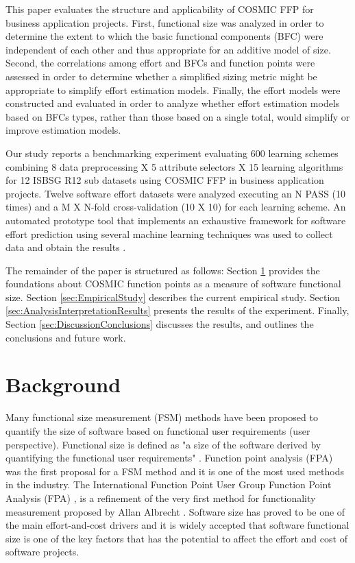 \documentclass[conference]{IEEEtran}
\begin{document}
This paper evaluates the structure and applicability of COSMIC FFP for business application projects. First, functional size was analyzed in order to determine the extent to which the basic functional components (BFC) were independent of each other and thus appropriate for an additive model of size. Second, the correlations among effort and BFCs and function points were assessed in order to determine whether a simplified sizing metric might be appropriate to simplify effort estimation models. Finally, the effort models were constructed and evaluated in order to analyze whether effort estimation models based on BFCs types, rather than those based on a single total, would simplify or improve estimation models.

Our study reports a benchmarking experiment evaluating 600 learning schemes combining 8 data preprocessing X 5 attribute selectors X 15 learning algorithms for 12 ISBSG R12 sub datasets using COSMIC FFP in business application projects. Twelve software effort datasets were analyzed executing an N PASS (10 times) and a M X N-fold cross-validation (10 X 10) for each learning scheme. An automated prototype tool that implements an exhaustive framework for software effort prediction using several machine learning techniques was used to collect data and obtain the results \cite{QuesadaLopezMurilloMorera:2016}.

The remainder of the paper is structured as follows: Section \ref{sec:Background} provides the foundations about COSMIC function points as a measure of software functional size. Section \ref{sec:EmpiricalStudy} describes the current empirical study. Section \ref{sec:AnalysisInterpretationResults} presents the results of the experiment. Finally, Section \ref{sec:DiscussionConclusions} discusses the results, and outlines the conclusions and future work.

 

\section{Background} \label{sec:Background}

Many functional size measurement (FSM) methods have been proposed to quantify the size of software based on functional user requirements (user perspective). Functional size is defined as "a size of the software derived by quantifying the functional user requirements" \cite{ISOP1:2007}. Function point analysis (FPA) \cite{Albrecht:1979} was the first proposal for a FSM method and it is one of the most used methods in the industry. The International Function Point User Group Function Point Analysis (FPA) \cite{ISO:2009}, is a refinement of the very first method for functionality measurement proposed by Allan Albrecht \cite{Albrecht:1979}. Software size has proved to be one of the main effort-and-cost drivers and it is widely accepted that software functional size is one of the key factors that has the potential to affect the effort and cost of software projects.
\end{document}
